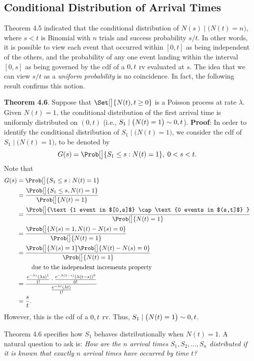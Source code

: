 \subsection*{Conditional Distribution of Arrival Times}
Theorem 4.5 indicated that the conditional distribution of $ N(s)\mid \bigl(N(t)=n\bigr) $,
where $ s<t $ is Binomial with $ n $ trials and success probability $ s/t $. In other words,
it is possible to view each event that occurred within $ [0,t] $ as being independent of the others, and the probability of any
one event landing within the interval $ [0,s] $ as being governed by the cdf of a
$ \relax{0,t} $ rv evaluated at $ s $. The idea that we can view $s/t$ as a \emph{uniform probability} is no coincidence. In
fact, the following result confirms this notion.
\begin{Result}
    \textbf{Theorem 4.6}. Suppose that $ \Set[\big]{N(t),t\ge 0} $ is a Poisson process at rate $ \lambda $. Given $ N(t)=1 $,
    the conditional distribution of the first arrival time is uniformly distributed on $ (0,t) $ (i.e., $ S_1\mid \bigl(N(t)=1\bigr) \sim \relax{0,t} $).
    \tcblower{}
    \textbf{Proof}: In order to identify the conditional distribution of $ S_1\mid \bigl(N(t)=1\bigr) $,
    we consider the cdf of $ S_1\mid \bigl(N(t)=1\bigr) $, to be denoted by
    \[ G(s)=\Prob[\big]{S_1\le s\given N(t)=1},\;0<s<t. \]
    Note that
    \begin{align*}
        G(s)
         & =\Prob[\big]{S_1\le s\given N(t)=1}                                                                                                     \\
         & =\frac{\Prob[\big]{S_1\le s, N(t)=1}}{\Prob[\big]{N(t)=1}}                                                                              \\
         & =\frac{\Prob[\big]{\text{1 event in $[0,s]$} \cap \text{0 events in $(s,t]$} }}{\Prob[\big]{N(t)=1}}                                    \\
         & =\frac{\Prob[\big]{N(s)=1,N(t)-N(s)=0}}{\Prob[\big]{N(t)=1}}                                                                            \\
         & =\frac{\Prob[\big]{N(s)=1}\Prob[\big]{N(t)-N(s)=0}}{\Prob[\big]{N(t)=1}}                                                                \\
         & \phantom{{}={}}\quad\text{due to the independent increments property}                                                                   \\
         & =\frac{\frac{e^{-\lambda s}(\lambda s)^1}{1!}\cdot \frac{e^{-\lambda (t-s)}(\lambda(t-s))^0}{0!}}{\frac{e^{-\lambda t}(\lambda t)}{1!}} \\
         & =\frac{s}{t}.
    \end{align*}
    However, this is the cdf of a $ \relax{0,t} $ rv. Thus, $ S_1\mid \bigl(N(t)=1\bigr) \sim \relax{0,t} $.
\end{Result}
Theorem 4.6 specifies how $ S_1 $ behaves distributionally when $ N(t)=1 $. A natural question to ask is:
\emph{How are the $ n $ arrival times $ S_1,S_2,\ldots,S_n $ distributed if it is known that exactly $ n $ arrival times
    have occurred by time $ t $?}


